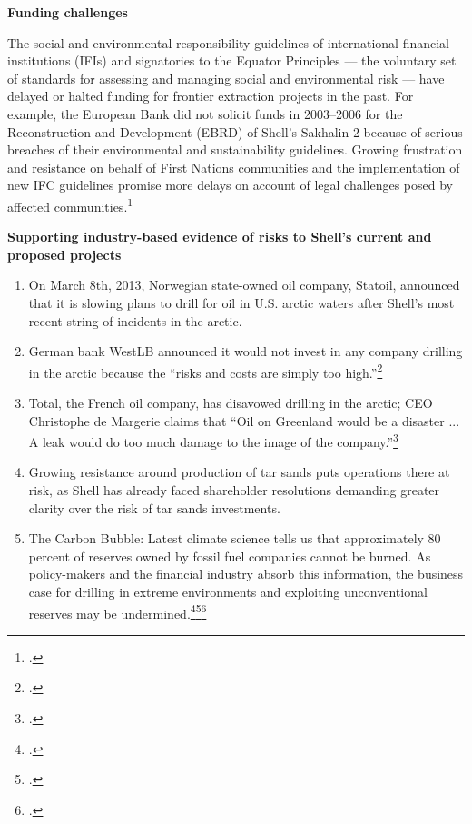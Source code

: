 \textbf{Funding challenges}



The social and environmental responsibility guidelines of international financial institutions (IFIs) and signatories to the Equator Principles --- the voluntary set of standards for assessing and managing social and environmental risk --- have delayed or halted funding for frontier extraction projects in the past. 
For example, the European Bank did not solicit funds in 2003--2006 for the Reconstruction and Development (EBRD) of Shell's Sakhalin-2 because of serious breaches of their environmental and sustainability guidelines. 
Growing frustration and resistance on behalf of First Nations communities and the implementation of new IFC guidelines promise more delays on account of legal challenges posed by affected communities.\footcite[][]{Mathiason_2005}



\textbf{Supporting industry-based evidence of risks to Shell's current and proposed projects}



\begin{enumerate}
	\item On March 8th, 2013, Norwegian state-owned oil company, Statoil, announced that it is slowing plans to drill for oil in U.S. arctic waters after Shell's most recent string of incidents in the arctic.
	\item German bank WestLB announced it would not invest in any company drilling in the arctic because the ``risks and costs are simply too high.''\footcite[][]{Naidoo_2012}
	\item Total, the French oil company, has disavowed drilling in the arctic; CEO Christophe de Margerie claims that ``Oil on Greenland would be a disaster ... A leak would do too much damage to the image of the company.''\footcite[][]{NewsWire_2012}
	\item Growing resistance around production of tar sands puts operations there at risk, as Shell has already faced shareholder resolutions demanding greater clarity over the risk of tar sands investments.
	\item The Carbon Bubble: Latest climate science tells us that approximately 80 percent of reserves owned by fossil fuel companies cannot be burned. As policy-makers and the financial industry absorb this information, the business case for drilling in extreme environments and exploiting unconventional reserves may be undermined.\footcite[][]{carbontracker}\footcite[][]{UNEP_2009}\footcite[][]{HSBC_2013}
\end{enumerate}



